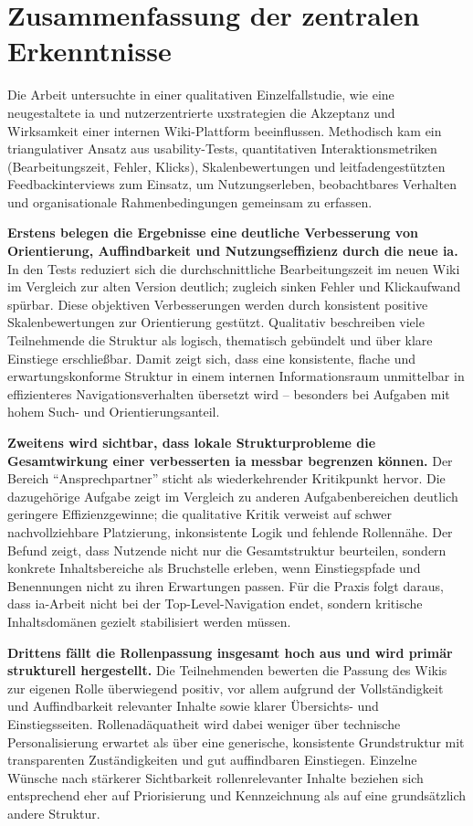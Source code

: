 \section{Zusammenfassung der zentralen Erkenntnisse}
\label{sec:08-01_summary}

Die Arbeit untersuchte in einer qualitativen Einzelfallstudie, wie eine neugestaltete \Gls{ia} und nutzerzentrierte \Gls{uxstrategien} die Akzeptanz und Wirksamkeit einer internen Wiki-Plattform beeinflussen. Methodisch kam ein triangulativer Ansatz aus \Gls{usability}-Tests, quantitativen Interaktionsmetriken (Bearbeitungszeit, Fehler, Klicks), Skalenbewertungen und leitfadengestützten Feedbackinterviews zum Einsatz, um Nutzungserleben, beobachtbares Verhalten und organisationale Rahmenbedingungen gemeinsam zu erfassen.

\textbf{Erstens belegen die Ergebnisse eine deutliche Verbesserung von Orientierung, Auffindbarkeit und Nutzungseffizienz durch die neue \Gls{ia}.} In den Tests reduziert sich die durchschnittliche Bearbeitungszeit im neuen Wiki im Vergleich zur alten Version deutlich; zugleich sinken Fehler und Klickaufwand spürbar. Diese objektiven Verbesserungen werden durch konsistent positive Skalenbewertungen zur Orientierung gestützt. Qualitativ beschreiben viele Teilnehmende die Struktur als logisch, thematisch gebündelt und über klare Einstiege erschließbar. Damit zeigt sich, dass eine konsistente, flache und erwartungskonforme Struktur in einem internen Informationsraum unmittelbar in effizienteres Navigationsverhalten übersetzt wird -- besonders bei Aufgaben mit hohem Such- und Orientierungsanteil.

\textbf{Zweitens wird sichtbar, dass lokale Strukturprobleme die Gesamtwirkung einer verbesserten \Gls{ia} messbar begrenzen können.} Der Bereich \enquote{Ansprechpartner} sticht als wiederkehrender Kritikpunkt hervor. Die dazugehörige Aufgabe zeigt im Vergleich zu anderen Aufgabenbereichen deutlich geringere Effizienzgewinne; die qualitative Kritik verweist auf schwer nachvollziehbare Platzierung, inkonsistente Logik und fehlende Rollennähe. Der Befund zeigt, dass Nutzende nicht nur die Gesamtstruktur beurteilen, sondern konkrete Inhaltsbereiche als Bruchstelle erleben, wenn Einstiegspfade und Benennungen nicht zu ihren Erwartungen passen. Für die Praxis folgt daraus, dass \Gls{ia}-Arbeit nicht bei der Top-Level-Navigation endet, sondern kritische Inhaltsdomänen gezielt stabilisiert werden müssen.

\textbf{Drittens fällt die Rollenpassung insgesamt hoch aus und wird primär strukturell hergestellt.} Die Teilnehmenden bewerten die Passung des Wikis zur eigenen Rolle überwiegend positiv, vor allem aufgrund der Vollständigkeit und Auffindbarkeit relevanter Inhalte sowie klarer Übersichts- und Einstiegsseiten. Rollenadäquatheit wird dabei weniger über technische Personalisierung erwartet als über eine generische, konsistente Grundstruktur mit transparenten Zuständigkeiten und gut auffindbaren Einstiegen. Einzelne Wünsche nach stärkerer Sichtbarkeit rollenrelevanter Inhalte beziehen sich entsprechend eher auf Priorisierung und Kennzeichnung als auf eine grundsätzlich andere Struktur.

